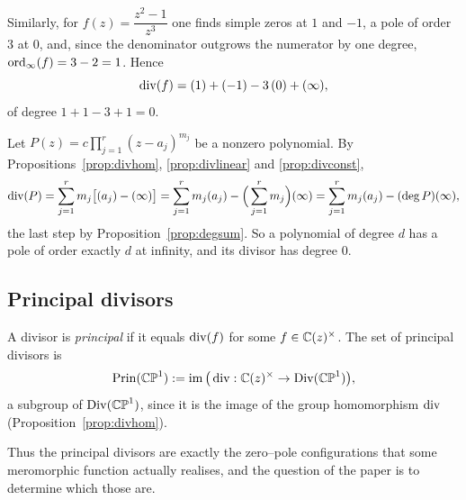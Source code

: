 \begin{example}
Similarly, for $f(z) = \dfrac{z^2-1}{z^3}$ one finds simple zeros at $1$ and
$-1$, a pole of order $3$ at $0$, and, since the denominator outgrows the
numerator by one degree, $\operatorname{ord}_\infty(f) = 3 - 2 = 1$. Hence
\[
\operatorname{div}(f) = (1) + (-1) - 3\,(0) + (\infty),
\]
of degree $1 + 1 - 3 + 1 = 0$.
\end{example}

\begin{example}\label{ex:poly}
Let $P(z) = c \prod_{j=1}^{r}(z-a_j)^{m_j}$ be a nonzero polynomial. By
Propositions~\ref{prop:divhom}, \ref{prop:divlinear} and \ref{prop:divconst},
\[
\operatorname{div}(P) = \sum_{j=1}^{r} m_j\big[(a_j) - (\infty)\big]
= \sum_{j=1}^{r} m_j (a_j) - \Big(\sum_{j=1}^{r} m_j\Big)(\infty)
= \sum_{j=1}^{r} m_j (a_j) - (\deg P)(\infty),
\]
the last step by Proposition~\ref{prop:degsum}. So a polynomial of degree $d$ has
a pole of order exactly $d$ at infinity, and its divisor has degree $0$.
\end{example}

\subsection{Principal divisors}

\begin{definition}\label{def:prin}
A divisor is \emph{principal} if it equals $\operatorname{div}(f)$ for some
$f \in \mathbb{C}(z)^\times$. The set of principal divisors is
\[
\operatorname{Prin}(\mathbb{CP}^1) := \operatorname{im}\big(\operatorname{div} : \mathbb{C}(z)^\times \to \operatorname{Div}(\mathbb{CP}^1)\big),
\]
a subgroup of $\operatorname{Div}(\mathbb{CP}^1)$, since it is the image of the group homomorphism
$\operatorname{div}$ (Proposition~\ref{prop:divhom}).
\end{definition}

Thus the principal divisors are exactly the zero--pole configurations that some
meromorphic function actually realises, and the question of the paper is to
determine which those are.

